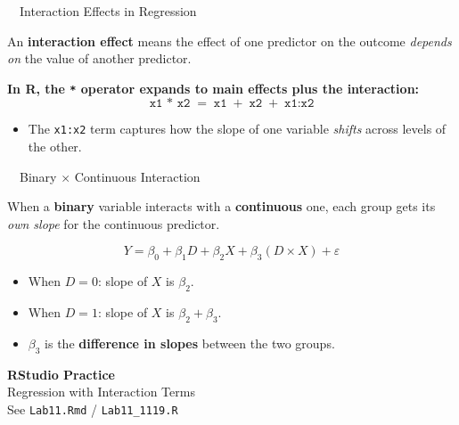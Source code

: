 \documentclass[aspectratio=169,11pt]{beamer}
\begin{document}
\begin{frame}{\ \ Interaction Effects in Regression}
  \begin{keybox}
    An \textbf{interaction effect} means the effect of one predictor on the
    outcome \emph{depends on} the value of another predictor.
  \end{keybox}
  \vspace{0.6em}
  \textbf{\color{qrnavy}In R, the \texttt{*} operator expands to main effects
  plus the interaction:}
  \begin{equation*}
    \texttt{x1 * x2} \;=\; \texttt{x1} \;+\; \texttt{x2} \;+\; \texttt{x1:x2}
  \end{equation*}
  \vspace{0.2em}
  \begin{itemize}
    \item The \texttt{x1:x2} term captures how the slope of one variable
          \emph{shifts} across levels of the other.
  \end{itemize}
\end{frame}

\begin{frame}{\ \ Binary $\times$ Continuous Interaction}
  \begin{keybox}
    When a \textbf{binary} variable interacts with a \textbf{continuous} one,
    each group gets its \emph{own slope} for the continuous predictor.
  \end{keybox}
  \vspace{0.5em}
  \begin{equation*}
    Y = \beta_0 + \beta_1 D + \beta_2 X + \beta_3 (D \times X) + \varepsilon
  \end{equation*}
  \begin{itemize}
    \item When $D = 0$: \quad slope of $X$ is $\beta_2$.
    \item When $D = 1$: \quad slope of $X$ is $\beta_2 + \beta_3$.
    \item $\beta_3$ is the \textbf{difference in slopes} between the two groups.
  \end{itemize}
\end{frame}

{
\begin{frame}
  \vfill
  \centering
  {\color{qrnavy}\Huge\bfseries RStudio Practice}\\[0.8em]
  {\color{qrblue}\large Regression with Interaction Terms}\\[0.4em]
  {\color{qrgray} See \texttt{Lab11.Rmd} / \texttt{Lab11\_1119.R}}
  \vfill
\end{frame}
}
\end{document}

